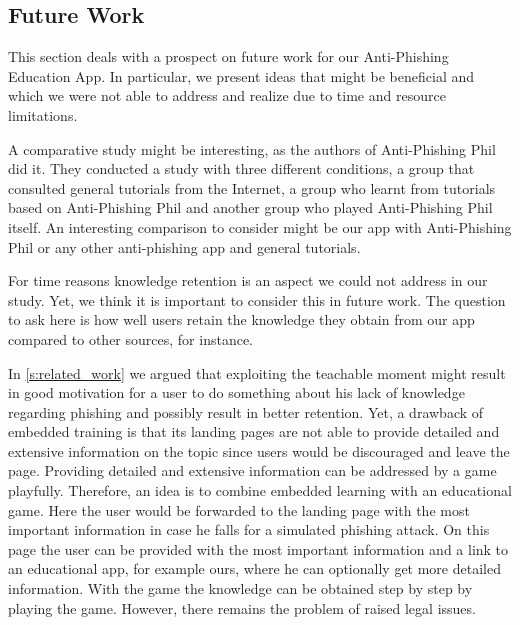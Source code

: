 \subsection{Future Work}
This section deals with a prospect on future work for our Anti-Phishing Education App.
 In particular, we present ideas that might be beneficial and which we were not able to address and realize due to time and resource limitations.

\begin{description}[leftmargin=0cm]
	\item[Comparative Study:] A comparative study might be interesting, as the authors of Anti-Phishing Phil~\cite{sheng2007antiphishingphil} did it.
	They conducted a study with three different conditions,  a group that consulted general tutorials from the Internet, a  group who learnt from tutorials based on Anti-Phishing Phil and another group who played Anti-Phishing Phil itself.
	An interesting comparison to consider might be our app with Anti-Phishing Phil or any other anti-phishing app and general tutorials.
	\item[Study on Retention:] For time reasons knowledge retention is an aspect we could not address in our study.
	Yet, we think it is important to consider this in future work.
	The question to ask here is how well users retain the knowledge they obtain from our app compared to other sources, for instance.
	\item[Embedded Training:] In \autoref{s:related_work} we argued that exploiting the teachable moment might result in good motivation for a user to do something about his lack of knowledge regarding phishing and possibly result in better retention.
	Yet, a drawback of embedded training is that its landing pages are not able to provide detailed and extensive information on the topic since users would be discouraged and leave the page.
	Providing detailed and extensive information can be addressed by a game playfully.
	Therefore, an idea is to combine embedded learning with an educational game.
	Here the user would be forwarded to the landing page with the most important information in case he falls for a simulated phishing attack.
	On this page the user can be provided with the most important information and a link to an educational app, for example ours, where he can optionally get more detailed information.
	With the game the knowledge can be obtained step by step by playing the game.
However, there remains the problem of raised legal issues.

\end{description}
